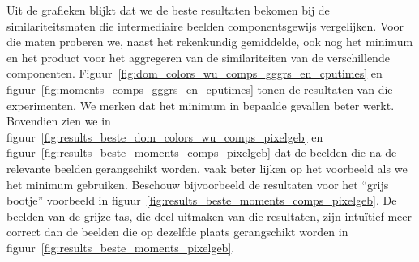 Uit de grafieken blijkt dat we de beste resultaten bekomen bij de similariteitsmaten 
die intermediaire beelden componentsgewijs vergelijken. Voor die maten proberen we, naast 
het rekenkundig gemiddelde, ook nog het minimum en het product voor het aggregeren 
van de similariteiten van de verschillende componenten. Figuur~\ref{fig:dom_colors_wu_comps_gggrs_en_cputimes}
en figuur~\ref{fig:moments_comps_gggrs_en_cputimes} tonen de resultaten van
die experimenten. We merken dat het minimum in bepaalde
gevallen beter werkt. Bovendien zien we in 
figuur~\ref{fig:results_beste_dom_colors_wu_comps_pixelgeb} en
figuur~\ref{fig:results_beste_moments_comps_pixelgeb} dat de beelden
die na de relevante beelden gerangschikt worden, vaak beter lijken op het voorbeeld als
we het minimum gebruiken. Beschouw bijvoorbeeld de resultaten voor het ``grijs bootje'' 
voorbeeld in figuur~\ref{fig:results_beste_moments_comps_pixelgeb}.
De beelden van de grijze tas, die deel uitmaken van die resultaten, zijn intu\"itief meer correct
dan de beelden die op dezelfde plaats gerangschikt worden in 
figuur~\ref{fig:results_beste_moments_pixelgeb}. 
